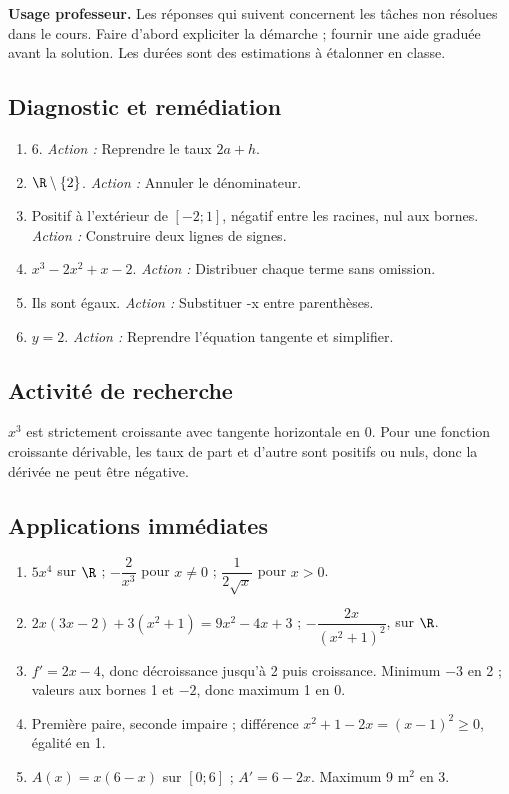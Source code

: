 \label{C06-CORR}
\textbf{Usage professeur.} Les réponses qui suivent concernent les tâches non résolues dans le cours. Faire d’abord expliciter la démarche ; fournir une aide graduée avant la solution. Les durées sont des estimations à étalonner en classe.
\subsection*{Diagnostic et remédiation}
\begin{enumerate}
\item $6$. \textit{Action :} Reprendre le taux $2a+h$.
\item $\R\setminus\{2\}$. \textit{Action :} Annuler le dénominateur.
\item Positif à l’extérieur de $[-2;1]$, négatif entre les racines, nul aux bornes. \textit{Action :} Construire deux lignes de signes.
\item $x^3-2x^2+x-2$. \textit{Action :} Distribuer chaque terme sans omission.
\item Ils sont égaux. \textit{Action :} Substituer -x entre parenthèses.
\item $y=2$. \textit{Action :} Reprendre l’équation tangente et simplifier.
\end{enumerate}
\subsection*{Activité de recherche}
$x^3$ est strictement croissante avec tangente horizontale en 0. Pour une fonction croissante dérivable, les taux de part et d’autre sont positifs ou nuls, donc la dérivée ne peut être négative.
\subsection*{Applications immédiates}
\begin{enumerate}
\item $5x^4$ sur $\R$ ; $-\dfrac{2}{x^3}$ pour $x\ne0$ ; $\dfrac{1}{2\sqrt x}$ pour $x>0$.
\item $2x(3x-2)+3(x^2+1)=9x^2-4x+3$ ; $-\dfrac{2x}{(x^2+1)^2}$, sur $\R$.
\item $f\prime=2x-4$, donc décroissance jusqu’à 2 puis croissance. Minimum $-3$ en 2 ; valeurs aux bornes 1 et $-2$, donc maximum 1 en 0.
\item Première paire, seconde impaire ; différence $x^2+1-2x=(x-1)^2\geq0$, égalité en 1.
\item $A(x)=x(6-x)$ sur $[0;6]$ ; $A\prime=6-2x$. Maximum 9 m$^2$ en 3.
\end{enumerate}
